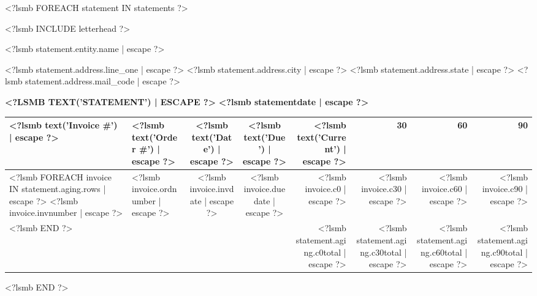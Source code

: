 \documentclass{scrartcl}
\begin{document}
<?lsmb FOREACH statement IN statements ?>
\pagestyle{myheadings}
\thispagestyle{empty}

\fontsize{10pt}{12pt}\selectfont

<?lsmb INCLUDE letterhead ?>

\parbox[t]{.5\textwidth}{
<?lsmb statement.entity.name | escape ?>

<?lsmb statement.address.line_one | escape ?>
<?lsmb statement.address.city | escape ?> <?lsmb statement.address.state | escape ?>
<?lsmb statement.address.mail_code | escape ?>
}
\hfill

\vspace{1cm}

\textbf{\MakeUppercase{<?lsmb text('Statement') | escape ?>}} \hfill
\textbf{<?lsmb statementdate | escape ?>}

\vspace{2cm}

\begin{tabular*}{\textwidth}{|ll@{\extracolsep\fill}ccrrrr|}
  \hline
  \textbf{<?lsmb text('Invoice #') | escape ?>} & \textbf{<?lsmb text('Order #') | escape ?>}
  & \textbf{<?lsmb text('Date') | escape ?>} & \textbf{<?lsmb text('Due') | escape ?>} &
  \textbf{<?lsmb text('Current') | escape ?>} & \textbf{30} & \textbf{60} & \textbf{90} \\
  \hline
<?lsmb FOREACH invoice IN statement.aging.rows | escape ?>
  <?lsmb invoice.invnumber | escape ?> &
  <?lsmb invoice.ordnumber | escape ?> &
  <?lsmb invoice.invdate | escape ?> &
  <?lsmb invoice.duedate | escape ?> &
  <?lsmb invoice.c0 | escape ?> &
  <?lsmb invoice.c30 | escape ?> &
  <?lsmb invoice.c60 | escape ?> &
  <?lsmb invoice.c90 | escape ?> \\
<?lsmb END ?>
\hline
 & & & &
 <?lsmb statement.aging.c0total | escape ?> &
 <?lsmb statement.aging.c30total | escape ?> &
 <?lsmb statement.aging.c60total | escape ?> &
 <?lsmb statement.aging.c90total | escape ?> \\
\hline
\end{tabular*}

\vspace{0.5cm}

\hfill
\pagebreak
<?lsmb END ?>
\end{document}
